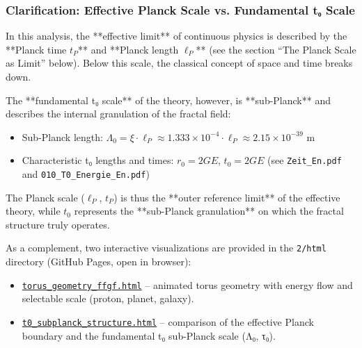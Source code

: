 	\subsubsection{Clarification: Effective Planck Scale vs. Fundamental t₀ Scale}
	In this analysis, the **effective limit** of continuous physics is described by the **Planck time \( t_P \)** and **Planck length \(\ell_P\)** (see the section ``The Planck Scale as Limit'' below). Below this scale, the classical concept of space and time breaks down.
	
	The **fundamental t₀ scale** of the theory, however, is **sub-Planck** and describes the internal granulation of the fractal field:
	\begin{itemize}
		\item Sub-Planck length: \(\Lambda_0 = \xi \cdot \ell_P \approx 1.333 \times 10^{-4} \cdot \ell_P \approx 2.15 \times 10^{-39} \) m
		\item Characteristic t₀ lengths and times: \( r_0 = 2GE \), \( t_0 = 2GE \) (see \texttt{Zeit\_En.pdf} and \texttt{010\_T0\_Energie\_En.pdf})
	\end{itemize}
	
	The Planck scale (\(\ell_P\), \( t_P \)) is thus the **outer reference limit** of the effective theory, while \( t_0 \) represents the **sub-Planck granulation** on which the fractal structure truly operates.
	
	As a complement, two interactive visualizations are provided in the \texttt{2/html} directory (GitHub Pages, open in browser):
	\begin{itemize}
		\item \href{https://jpascher.github.io/T0-Time-Mass-Duality/2/html/torus_geometry_ffgf.html}{\texttt{torus\_geometry\_ffgf.html}} – animated torus geometry with energy flow and selectable scale (proton, planet, galaxy).
		\item \href{https://jpascher.github.io/T0-Time-Mass-Duality/2/html/t0_subplanck_structure.html}{\texttt{t0\_subplanck\_structure.html}} – comparison of the effective Planck boundary and the fundamental t₀ sub-Planck scale (Λ₀, τ₀).
	\end{itemize}
	
